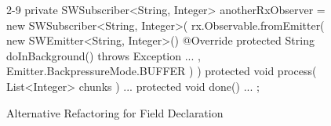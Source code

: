 \begin{figure}[H]
\begin{sourcecode}
\begin{javacode}{2-9}
private SWSubscriber<String, Integer> anotherRxObserver = new SWSubscriber<String, Integer>(
			rx.Observable.fromEmitter( 
				new SWEmitter<String, Integer>() {
					@Override
					protected String doInBackground() 
					throws Exception {
						...
					}
			}, Emitter.BackpressureMode.BUFFER )
	) {
	protected void process( List<Integer> chunks ) {...}
	protected void done() {...}
};	
\end{javacode}
\caption{Alternative Refactoring for Field Declaration}
\label{code:fd-alternative}
\end{sourcecode}
\end{figure}